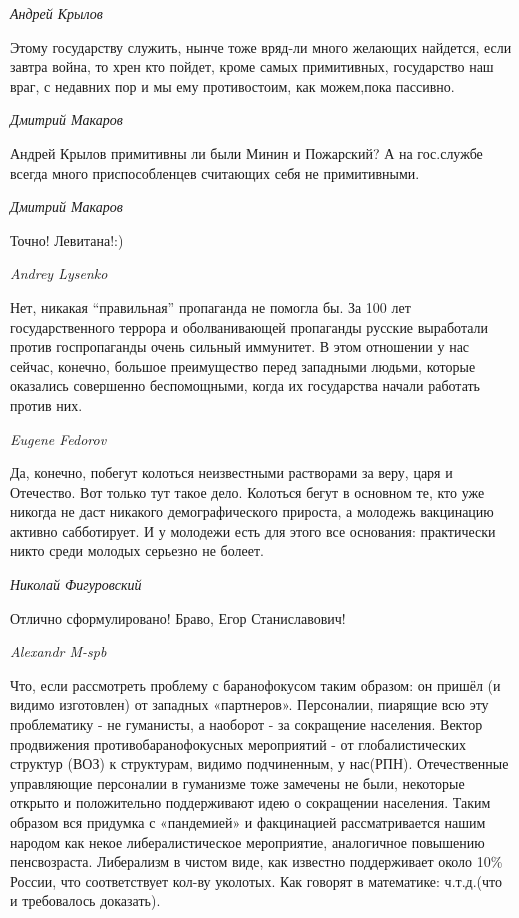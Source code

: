 \emph{Андрей Крылов}

Этому государству служить, нынче тоже вряд-ли много желающих найдется, если
завтра война, то хрен кто пойдет, кроме самых примитивных, государство наш
враг, с недавних пор и мы ему противостоим, как можем,пока пассивно.

\emph{Дмитрий Макаров}

Андрей Крылов примитивны ли были Минин и Пожарский? А на гос.службе всегда
много приспособленцев считающих себя не примитивными.

\emph{Дмитрий Макаров}

Точно! Левитана!:)

\emph{Andrey Lysenko}

Нет, никакая \enquote{правильная} пропаганда не помогла бы. За 100 лет государственного
террора и оболванивающей пропаганды русские выработали против госпропаганды
очень сильный иммунитет. В этом отношении у нас сейчас, конечно, большое
преимущество перед западными людьми, которые оказались совершенно беспомощными,
когда их государства начали работать против них.

\emph{Eugene Fedorov}

Да, конечно, побегут колоться неизвестными растворами за веру, царя и
Отечество. Вот только тут такое дело. Колоться бегут в основном те, кто уже
никогда не даст никакого демографического прироста, а молодежь вакцинацию
активно сабботирует. И у молодежи есть для этого все основания: практически
никто среди молодых серьезно не болеет.

\emph{Николай Фигуровский}

Отлично сформулировано! Браво, Егор Станиславович!

\emph{Alexandr M-spb}

Что, если рассмотреть проблему с баранофокусом таким образом: он пришёл (и
видимо изготовлен) от западных «партнеров». Персоналии, пиарящие всю эту
проблематику - не гуманисты, а наоборот - за сокращение населения. Вектор
продвижения противобаранофокусных мероприятий - от глобалистических структур
(ВОЗ) к структурам, видимо подчиненным, у нас(РПН). Отечественные управляющие
персоналии в гуманизме тоже замечены не были, некоторые открыто и положительно
поддерживают идею о сокращении населения. Таким образом вся придумка с
«пандемией» и факцинацией рассматривается нашим народом как некое
либералистическое мероприятие, аналогичное повышению пенсвозраста. Либерализм в
чистом виде, как известно поддерживает около 10\% России, что соответствует
кол-ву уколотых. Как говорят в математике: ч.т.д.(что и требовалось доказать).

